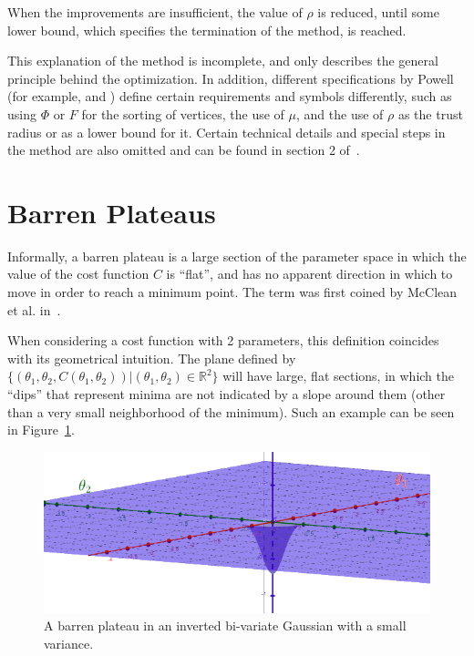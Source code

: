 \documentclass[a4paper,12pt]{article}
\begin{document}
When the improvements are insufficient, the value of $\rho$ is reduced, until some lower bound, which specifies the termination of the method, is reached.

This explanation of the method is incomplete, and only describes the general principle behind the optimization. In addition, different specifications by Powell (for example, \cite{Powell1994} and \cite{powell_view_2007}) define certain requirements and symbols differently, such as using $\Phi$ or $F$ for the sorting of vertices, the use of $\mu$, and the use of $\rho$ as the trust radius or as a lower bound for it.
Certain technical details and special steps in the method are also omitted and can be found in section 2 of~\cite{Powell1994}.


\section{Barren Plateaus} \label{sec:bps}
Informally, a barren plateau is a large section of the parameter space in which the value of the cost function $C$ is ``flat'', and has no apparent direction in which to move in order to reach a minimum point. The term was first coined by McClean et al. in~\cite{mcclean_barren_2018}.

When considering a cost function with 2 parameters, this definition coincides with its geometrical intuition. The plane defined by $\{(\theta_1, \theta_2, C(\theta_1, \theta_2)) | (\theta_1, \theta_2) \in \mathbb{R}^2\}$ will have large, flat sections, in which the ``dips'' that represent minima are not indicated by a slope around them (other than a very small neighborhood of the minimum). Such an example can be seen in Figure~\ref{fig:bp}.

\begin{figure}[h]
    \centering
    \captionsetup{justification=centering, margin=0.5cm}
    \includegraphics[scale=0.5]{bp_3d.png}
    \caption{A barren plateau in an inverted bi-variate Gaussian with a small variance.}
    \label{fig:bp}
\end{figure}
\end{document}
